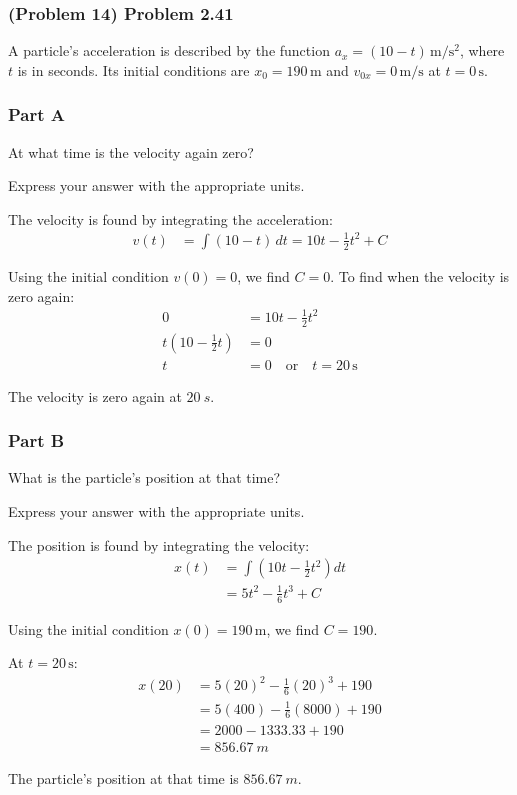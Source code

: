 \newpage

\subsubsection{(Problem 14) Problem 2.41}

A particle's acceleration is described by the function \( a_x = (10 - t) \, \mathrm{m/s^2} \), where \( t \) is in seconds. Its initial conditions are \( x_0 = 190 \, \mathrm{m} \) and \( v_{0x} = 0 \, \mathrm{m/s} \) at \( t = 0 \, \mathrm{s} \).

\subsubsection{Part A}
At what time is the velocity again zero?

Express your answer with the appropriate units.

\begin{solution}
	The velocity is found by integrating the acceleration:
	\begin{align*}
		v(t) &= \int (10 - t) \, dt = 10t - \frac{1}{2} t^2 + C
	\end{align*}

	Using the initial condition \( v(0) = 0 \), we find \( C = 0 \). To find when the velocity is zero again:
	\begin{align*}
		0 &= 10t - \frac{1}{2} t^2 \\
		t \left(10 - \frac{1}{2} t \right) &= 0 \\
		t &= 0 \quad \text{or} \quad t = 20 \, \mathrm{s}
	\end{align*}

	The velocity is zero again at \( \boxed{\SI{20}{s}} \).
\end{solution}

\subsubsection{Part B}
What is the particle's position at that time?

Express your answer with the appropriate units.

\begin{solution}
	The position is found by integrating the velocity:
	\begin{align*}
		x(t) &= \int \left(10t - \frac{1}{2} t^2 \right) dt \\
		&= 5t^2 - \frac{1}{6} t^3 + C
	\end{align*}

	Using the initial condition \( x(0) = 190 \, \mathrm{m} \), we find \( C = 190 \).

	At \( t = 20 \, \mathrm{s} \):
	\begin{align*}
		x(20) &= 5(20)^2 - \frac{1}{6} (20)^3 + 190 \\
		&= 5(400) - \frac{1}{6}(8000) + 190 \\
		&= 2000 - 1333.33 + 190 \\
		&= \SI{856.67}{m}
	\end{align*}

	The particle's position at that time is \( \boxed{\SI{856.67}{m}} \).
\end{solution}

